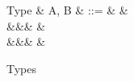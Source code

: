 \begin{figure}[H]
\begin{syntaxfig}
\mbox{Type}
&
A, B
&
::=
&
\tyNat
&
\\
&&&
&
\\
&&&
&
\end{syntaxfig}
\caption{Types}
\end{figure}
